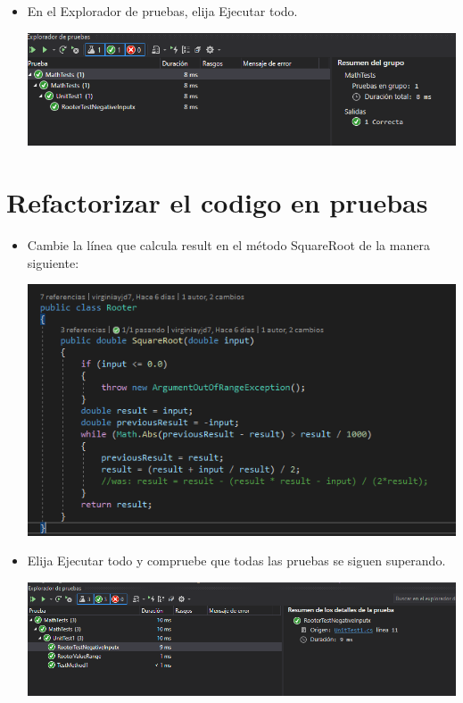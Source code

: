 \begin{itemize}
\begin{center}
\end{center} 
\item En el Explorador de pruebas, elija Ejecutar todo.
\begin{center}
\includegraphics[width=\columnwidth]{images/17}\newline
\end{center} 
\end{itemize}

\section { Refactorizar el codigo en pruebas } 

\begin{itemize}

\item Cambie la línea que calcula result en el método SquareRoot de la manera siguiente:
\begin{center}
\includegraphics[width=\columnwidth]{images/004}\newline
\end{center} 
\item Elija Ejecutar todo y compruebe que todas las pruebas se siguen superando.
\begin{center}
\includegraphics[width=\columnwidth]{images/005}\newline
\end{center}

\end{itemize}
